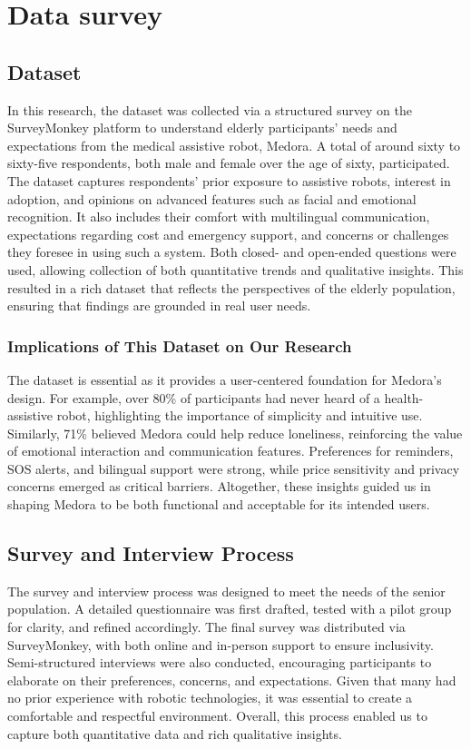 \chapter{Data survey}

\section{Dataset}
In this research, the dataset was collected via a structured survey on the SurveyMonkey platform to understand elderly participants' needs and expectations from the medical assistive robot, Medora. A total of around sixty to sixty-five respondents, both male and female over the age of sixty, participated. The dataset captures respondents' prior exposure to assistive robots, interest in adoption, and opinions on advanced features such as facial and emotional recognition. It also includes their comfort with multilingual communication, expectations regarding cost and emergency support, and concerns or challenges they foresee in using such a system. Both closed- and open-ended questions were used, allowing collection of both quantitative trends and qualitative insights. This resulted in a rich dataset that reflects the perspectives of the elderly population, ensuring that findings are grounded in real user needs.

\subsection{Implications of This Dataset on Our Research}
The dataset is essential as it provides a user-centered foundation for Medora’s design. For example, over 80\% of participants had never heard of a health-assistive robot, highlighting the importance of simplicity and intuitive use. Similarly, 71\% believed Medora could help reduce loneliness, reinforcing the value of emotional interaction and communication features. Preferences for reminders, SOS alerts, and bilingual support were strong, while price sensitivity and privacy concerns emerged as critical barriers. Altogether, these insights guided us in shaping Medora to be both functional and acceptable for its intended users.


\section{Survey and Interview Process}

The survey and interview process was designed to meet the needs of the senior population. A detailed questionnaire was first drafted, tested with a pilot group for clarity, and refined accordingly. The final survey was distributed via SurveyMonkey, with both online and in-person support to ensure inclusivity. Semi-structured interviews were also conducted, encouraging participants to elaborate on their preferences, concerns, and expectations. Given that many had no prior experience with robotic technologies, it was essential to create a comfortable and respectful environment. Overall, this process enabled us to capture both quantitative data and rich qualitative insights.

